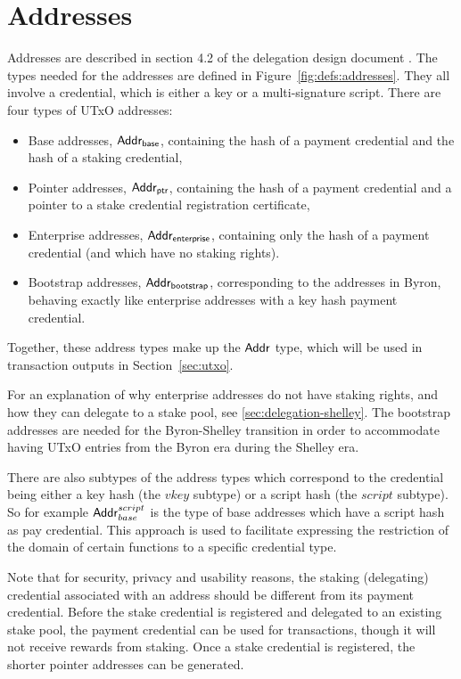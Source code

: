 \section{Addresses}
\label{sec:addresses}

Addresses are described in section 4.2 of the delegation design document \cite{delegation_design}.
The types needed for the addresses are defined in Figure~\ref{fig:defs:addresses}.
They all involve a credential, which is either a key or a multi-signature script.
There are four types of UTxO addresses:
\begin{itemize}
\item Base addresses, $\mathsf{Addr_{base}}$, containing the hash of a payment credential and
  the hash of a staking credential,
\item Pointer addresses, $\mathsf{Addr_{ptr}}$, containing the hash of a payment credential
  and a pointer to a stake credential registration certificate,
\item Enterprise addresses, $\mathsf{Addr_{enterprise}}$,
  containing only the hash of a payment credential (and which have no staking rights).
\item Bootstrap addresses, $\mathsf{Addr_{bootstrap}}$, corresponding to the addresses in
  Byron, behaving exactly like enterprise addresses with a key hash
  payment credential.
\end{itemize}

\noindent Together, these address types make up the $\mathsf{Addr}$ type, which will be
used in transaction outputs in Section~\ref{sec:utxo}.

For an explanation of why enterprise addresses do not have staking rights,
and how they can delegate to a stake pool, see \ref{sec:delegation-shelley}.
The bootstrap addresses are needed for the Byron-Shelley transition in order to
accommodate having UTxO entries from the Byron era during the Shelley era.

There are also subtypes of the address types which correspond to the credential
being either a key hash (the $vkey$ subtype) or a script hash (the $script$
subtype). So for example $\mathsf{Addr}_{base}^{script}$ is the type of base addresses
which have a script hash as pay credential. This approach is used to facilitate
expressing the restriction of the domain of certain functions to a specific
credential type.

Note that for security, privacy and usability reasons, the staking (delegating)
credential associated with an address should be different from its payment
credential.  Before the stake credential is registered and delegated to an
existing stake pool, the payment credential can be used for transactions, though
it will not receive rewards from staking.  Once a stake credential is
registered, the shorter pointer addresses can be generated.

